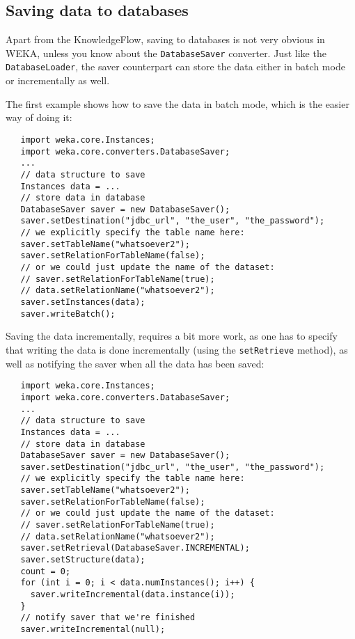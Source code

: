 \subsection{Saving data to databases}
Apart from the KnowledgeFlow, saving to databases is not very obvious in WEKA,
unless you know about the \texttt{DatabaseSaver} converter. Just like the
\texttt{DatabaseLoader}, the saver counterpart can store the data either in
batch mode or incrementally as well.

The first example shows how to save the data in batch mode, which is the easier
way of doing it:
\begin{verbatim}
   import weka.core.Instances;
   import weka.core.converters.DatabaseSaver;
   ...
   // data structure to save
   Instances data = ...
   // store data in database
   DatabaseSaver saver = new DatabaseSaver();
   saver.setDestination("jdbc_url", "the_user", "the_password");
   // we explicitly specify the table name here:
   saver.setTableName("whatsoever2");
   saver.setRelationForTableName(false);
   // or we could just update the name of the dataset:
   // saver.setRelationForTableName(true);
   // data.setRelationName("whatsoever2");
   saver.setInstances(data);
   saver.writeBatch();
\end{verbatim}
Saving the data incrementally, requires a bit more work, as one has to specify
that writing the data is done incrementally (using the \texttt{setRetrieve}
method), as well as notifying the saver when all the data has been saved:
\begin{verbatim}
   import weka.core.Instances;
   import weka.core.converters.DatabaseSaver;
   ...
   // data structure to save
   Instances data = ...
   // store data in database
   DatabaseSaver saver = new DatabaseSaver();
   saver.setDestination("jdbc_url", "the_user", "the_password");
   // we explicitly specify the table name here:
   saver.setTableName("whatsoever2");
   saver.setRelationForTableName(false);
   // or we could just update the name of the dataset:
   // saver.setRelationForTableName(true);
   // data.setRelationName("whatsoever2");
   saver.setRetrieval(DatabaseSaver.INCREMENTAL);
   saver.setStructure(data);
   count = 0;
   for (int i = 0; i < data.numInstances(); i++) {
     saver.writeIncremental(data.instance(i));
   }
   // notify saver that we're finished
   saver.writeIncremental(null);
\end{verbatim}
